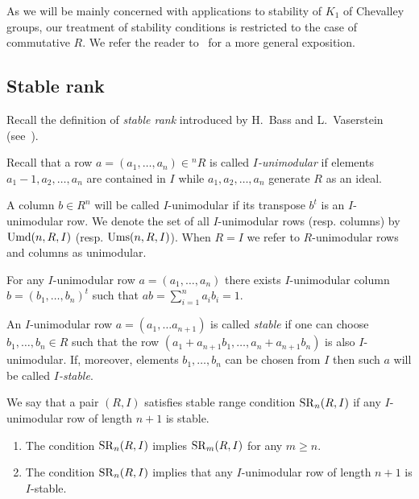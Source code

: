 As we will be mainly concerned with applications to stability of $K_1$ of Chevalley groups, our treatment of stability conditions is restricted to the case of commutative $R$. 
We refer the reader to~\cite{Ba64, Va69, Va71} for a more general exposition.

\subsection{Stable rank}
Recall the definition of {\it stable rank} introduced by H.~Bass and L.~Vaserstein (see~\cite{Ba64, Va69}).
\begin{dfn}
Recall that a row $a=(a_1,\ldots,a_n)\in{}^n\!R$ is called {\it $I$-unimodular} if elements $a_1-1,a_2,\ldots,a_n$ are contained in $I$ while $a_1,a_2,\ldots,a_n$ generate $R$ as an ideal.
\end{dfn}
A column $b \in R^n$ will be called $I$-unimodular if its transpose $b^t$ is an $I$-unimodular row. We denote the set of all $I$-unimodular rows (resp. columns) by $\operatorname{Umd}(n,R,I)$ (resp. $\operatorname{Ums}(n,R,I)$).
When $R=I$ we refer to $R$-unimodular rows and columns as unimodular.

\begin{lemma}\label{lemma:relstrlemma}
For any $I$-unimodular row $a=(a_1,\ldots,a_n)$ there exists $I$-unimodular column $b=(b_1,\ldots,b_n)^t$ such that $ab=\sum\limits_{i=1}^n a_i b_i=1$.
\end{lemma}

\begin {dfn} An $I$-unimodular row $a=(a_1,\ldots a_{n+1})$ is called {\it stable} if one can choose $b_1,\ldots,b_n\in R$ such that the row $(a_1+a_{n+1}b_1,\ldots,a_n+a_{n+1}b_n)$ is also $I$-unimodular. If, moreover, elements $b_1,\ldots,b_n$ can be chosen from  $I$ then such $a$ will be called {\it $I$-stable}. \end{dfn} 

We say that a pair $(R,I)$ satisfies stable range condition $\operatorname{SR}_n(R,I)$ if any $I$-unimodular row of length $n+1$ is stable.
\begin{lemma}\label{lemma:relstrlemma2}\strut
\begin{enumerate}
\item The condition $\operatorname{SR}_n(R,I)$ implies $\operatorname{SR}_m(R,I)$ for any $m\geqslant n$.
\item The condition $\operatorname{SR}_n(R,I)$ implies that any $I$-unimodular row of length $n+1$ is $I$-stable.
\end{enumerate}
\end{lemma}

